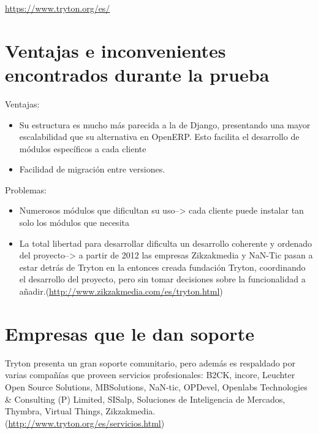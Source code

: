 \documentclass{article}
\begin{document}
\url{https://www.tryton.org/es/}


\section{Ventajas e inconvenientes encontrados durante la prueba}
Ventajas:
\begin{itemize}
    \item Su estructura es mucho más parecida a la de Django, presentando una mayor escalabilidad que su alternativa en OpenERP. Esto facilita el desarrollo de módulos específicos a cada cliente
    \item Facilidad de migración entre versiones.
\end{itemize}

Problemas:
\begin{itemize}
    \item Numerosos módulos que dificultan su uso--> cada cliente puede instalar tan solo los módulos que necesita
    \item La total libertad para desarrollar dificulta un desarrollo coherente y ordenado del proyecto--> a partir de 2012 las empresas Zikzakmedia y NaN-Tic pasan a estar detrás de Tryton en la entonces creada fundación Tryton, coordinando el desarrollo del proyecto, pero sin tomar decisiones sobre la funcionalidad a añadir.(\url{http://www.zikzakmedia.com/es/tryton.html})
\end{itemize}


\section{Empresas que le dan soporte}

Tryton presenta un gran soporte comunitario, pero además es respaldado por varias compañías que proveen servicios profesionales:
B2CK, incore, Leuchter Open Source Solutions, MBSolutions, NaN-tic, OPDevel, Openlabs Technologies  \& Consulting (P) Limited, SISalp, Soluciones de Inteligencia de Mercados, Thymbra,
Virtual Things, Zikzakmedia.(\url{http://www.tryton.org/es/servicios.html})
\end{document}
